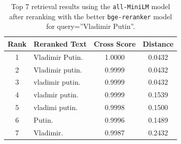 \documentclass[conference]{IEEEtran}
\begin{document}
\begin{table}[h]
\centering
\small
\begin{tabular}{|c|p{13cm}|c|c|}
\hline
\textbf{Rank} & \textbf{Reranked Text} & \textbf{Cross Score} & \textbf{Distance} \\
\hline
1 & Vladimir Putin. & 1.0000 & 0.0432 \\
\hline
2 & Vladimir putin. & 0.9999 & 0.0432 \\
\hline
3 & vladimir putin. & 0.9999 & 0.0432 \\
\hline
4 & vladmir putin. & 0.9999 & 0.1539 \\
\hline
5 & vladimi putin. & 0.9998 & 0.1500 \\
\hline
6 & Putin. & 0.9996 & 0.1489 \\
\hline
7 & Vladimir. & 0.9987 & 0.2432 \\
\hline
\end{tabular}
\caption{Top 7 retrieval results using the \texttt{all-MiniLM} model after reranking with the better \texttt{bge-reranker} model for query=''Vladimir Putin''.}
\label{tab:short_query_reranked_high_end}
\end{table}
\end{document}
